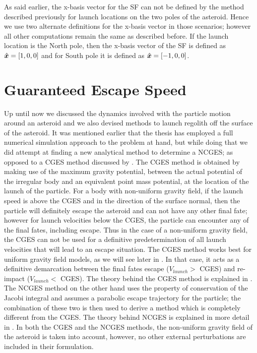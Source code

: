 \FloatBarrier
As said earlier, the x-basis vector for the \gls{SF} can not be defined by the method described previously for launch locations on the two poles of the asteroid. Hence we use two alternate definitions for the x-basis vector in those scenarios; however all other computations remain the same as described before. If the launch location is the North pole, then the x-basis vector of the \gls{SF} is defined as $\hat{\bm{x}}=[1, 0, 0]$ and for South pole it is defined as $\hat{\bm{x}}=[-1, 0, 0]$.

\section{Guaranteed Escape Speed}
\label{sec:escape_speed_derivation}
Up until now we discussed the dynamics involved with the particle motion around an asteroid and we also devised methods to launch regolith off the surface of the asteroid. It was mentioned earlier that the thesis has employed a full numerical simulation approach to the problem at hand, but while doing that we did attempt at finding a new analytical method to determine a \gls{NCGES}; as opposed to a \gls{CGES} method discussed by \cite{scheeresBook}.
%
\newline\newline
%
The \gls{CGES} method is obtained by making use of the maximum gravity potential, between the actual potential of the irregular body and an equivalent point mass potential, at the location of the launch of the particle. For a body with non-uniform gravity field, if the launch speed is above the \gls{CGES} and in the direction of the surface normal, then the particle will definitely escape the asteroid and can not have any other final fate; however for launch velocities below the \gls{CGES}, the particle can encounter any of the final fates, including escape. Thus in the case of a non-uniform gravity field, the \gls{CGES} can not be used for a definitive predetermination of all launch velocities that will lead to an escape situation. The \gls{CGES} method works best for uniform gravity field models, as we will see later in . In that case, it acts as a definitive demarcation between the final fates escape ($V_{launch} > $ \gls{CGES}) and re-impact ($V_{launch} < $ \gls{CGES}). The theory behind the \gls{CGES} method is explained in .
%
\newline\newline
%
The \gls{NCGES} method on the other hand uses the property of conservation of the Jacobi integral and assumes a parabolic escape trajectory for the particle; the combination of these two is then used to derive a method which is completely different from the \gls{CGES}. The theory behind \gls{NCGES} is explained in more detail in . In both the \gls{CGES} and the \gls{NCGES} methods, the non-uniform gravity field of the asteroid is taken into account, however, no other external perturbations are included in their formulation.
